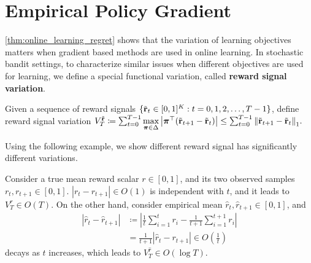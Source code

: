 \section{Empirical Policy Gradient}
\label{sec:policy_gradient}

\cref{thm:online_learning_regret} shows that the variation of learning objectives matters when gradient based methods are used in online learning. In stochastic bandit settings, to characterize similar issues when different objectives are used for learning, we define a special functional variation, called \textbf{reward signal variation}.

\begin{defi}
\label{defi:reward_signal_variation}
Given a sequence of reward signals $\{ \tilde{{\mathbf{r}}}_t \in [0,1]^K: t = 0, 1, 2, \dots, T-1 \}$, define reward signal variation
$V_{T}^{\tilde{{\mathbf{r}}}} \coloneqq \sum_{t=0}^{T-1}{\max\limits_{{\boldsymbol{\pi}} \in \Delta}{\left| {\boldsymbol{\pi}}^\top(\tilde{{\mathbf{r}}}_{t+1} - \tilde{{\mathbf{r}}}_{t}) \right| } } \le \sum_{t=0}^{T-1}{\left\| \tilde{{\mathbf{r}}}_{t+1} - \tilde{{\mathbf{r}}}_{t} \right\|_1  }.$
\end{defi}

Using the following example, we show different reward signal has significantly different variations.

\begin{eg}
Consider a true mean reward scalar $r \in [0, 1]$, and its two observed samples $r_t, r_{t+1} \in [0, 1]$. $\left| r_t - r_{t+1} \right| \in O(1)$ is independent with $t$, and it leads to $V_T^r \in O(T)$. On the other hand, consider empirical mean $\hat{r}_t, \hat{r}_{t+1} \in [0, 1]$, and
\begin{equation*}
\begin{split}
	\left| \hat{r}_{t} - \hat{r}_{t+1} \right| &\coloneqq \left| \frac{1}{t} \sum_{i=1}^{t}{ r_i } - \frac{1}{t+1} \sum_{i=1}^{t+1}{ r_i } \right| \\
	&= \frac{1}{t+1} \left| \hat{r}_t - r_{t+1} \right| \in O\left(\frac{1}{t}\right)
\end{split}
\end{equation*}
decays as $t$ increases, which leads to $V_T^{\hat{r}} \in O(\log{T})$.
\end{eg}

